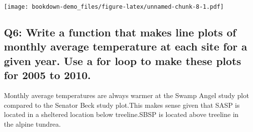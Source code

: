 \documentclass[
]{book}
\begin{document}
\texttt{[image: bookdown-demo\_files/figure-latex/unnamed-chunk-8-1.pdf]}

\hypertarget{q6-write-a-function-that-makes-line-plots-of-monthly-average-temperature-at-each-site-for-a-given-year.-use-a-for-loop-to-make-these-plots-for-2005-to-2010.}{%
\subsection{Q6: Write a function that makes line plots of monthly average temperature at each site for a given year. Use a for loop to make these plots for 2005 to 2010.}\label{q6-write-a-function-that-makes-line-plots-of-monthly-average-temperature-at-each-site-for-a-given-year.-use-a-for-loop-to-make-these-plots-for-2005-to-2010.}}

Monthly average temperatures are always warmer at the Swamp Angel study plot compared to the Senator Beck study plot.This makes sense given that SASP is located in a sheltered location below treeline.SBSP is located above treeline in the alpine tundrea.
\end{document}
